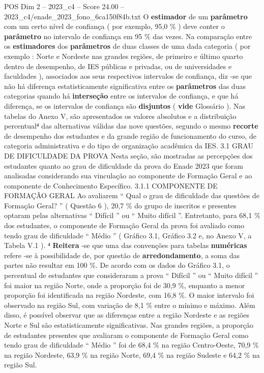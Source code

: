 \begin{textsample}{POS Dim 2 – 2023\_c4 – Score 24.00 – 2023\_c4/enade\_2023\_fono\_6ca150f84b.txt}
O \textbf{estimador} de um \textbf{parâmetro} com um certo nível de confiança ( por exemplo, 95,0 \% ) deve conter o \textbf{parâmetro} no intervalo de confiança em 95 \% das vezes.
Na comparação entre os \textbf{estimadores} dos \textbf{parâmetros} de duas classes de uma dada categoria ( por exemplo : Norte e Nordeste nas grandes regiões, de primeiro e último quarto dentro de desempenho, de IES públicas e privadas, ou de universidades e faculdades ), associados aos seus respectivos intervalos de confiança, diz -se que não há diferença estatisticamente significativa entre os \textbf{parâmetros} das duas categorias quando há \textbf{interseção} entre os intervalos de confiança, e que há diferença, se os intervalos de confiança são \textbf{disjuntos} ( \textbf{vide} Glossário ).
Nas tabelas do Anexo V, são apresentados os valores absolutos e a distribuição percentual⁴ das alternativas válidas das nove questões, segundo o mesmo \textbf{recorte} de desempenho dos estudantes e da grande região de funcionamento do curso, de categoria administrativa e do tipo de organização acadêmica da IES. 3.1 GRAU DE DIFICULDADE DA PROVA Nesta seção, são mostradas as percepções dos estudantes quanto ao grau de dificuldade da prova do Enade 2023 que foram analisadas considerando sua vinculação ao componente de Formação Geral e ao componente de Conhecimento Específico. 3.1.1 COMPONENTE DE FORMAÇÃO GERAL Ao avaliarem “ Qual o grau de dificuldade das questões de Formação Geral? ” ( Questão 6 ), 20,7 \% do grupo de inscritos e presentes optaram pelas alternativas “ Difícil ” ou “ Muito difícil ”.
Entretanto, para 68,1 \% dos estudantes, o componente de Formação Geral da prova foi avaliado como tendo grau de dificuldade “ Médio ” ( Gráfico 3.1, Gráfico 3.2 e, no Anexo V, a Tabela V.1 ). ⁴ \textbf{Reitera} -se que uma das convenções para tabelas \textbf{numéricas} refere -se à possibilidade de, por questão de \textbf{arredondamento}, a soma das partes não resultar em 100 \%.
De acordo com os dados do Gráfico 3.1, o percentual de estudantes que consideraram a prova “ Difícil ” ou “ Muito difícil ” foi maior na região Norte, onde a proporção foi de 30,9 \%, enquanto a menor proporção foi identificada na região Nordeste, com 16,8 \%.
O maior intervalo foi observado na região Sul, com variação de 8,1 \% entre o mínimo e máximo.
Além disso, é possível observar que as diferenças entre a região Nordeste e as regiões Norte e Sul são estatisticamente significativas.
Nas grandes regiões, a proporção de estudantes presentes que avaliaram o componente de Formação Geral como tendo grau de dificuldade “ Médio ” foi de 68,4 \% na região Centro-Oeste, 70,9 \% na região Nordeste, 63,9 \% na região Norte, 69,4 \% na região Sudeste e 64,2 \% na região Sul.

\end{textsample}
